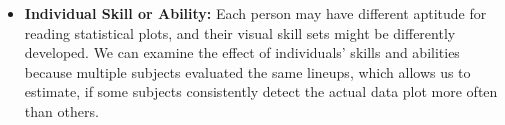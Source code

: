 \documentclass[10pt]{article}\usepackage[]{graphicx}\usepackage[]{xcolor}
\begin{document}
\begin{itemize}
\item{\bf Individual Skill or Ability:} Each person may have different  aptitude for reading statistical plots, and their visual skill sets might be differently developed.  We can examine the effect of individuals' skills and abilities because multiple subjects evaluated the same lineups, which allows us to estimate, if some subjects consistently detect the actual data plot more often than others.  
\end{itemize}
\end{document}
